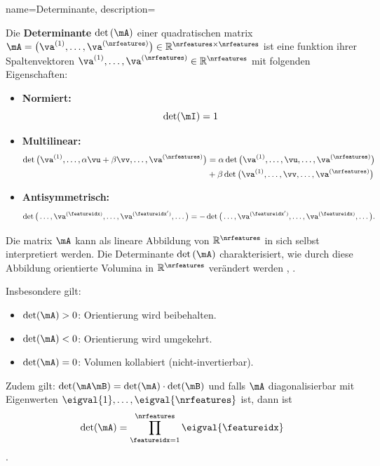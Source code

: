 {name={Determinante},
 description={Die \textbf{Determinante} $\det\,(\mA)$ einer quadratischen \gls{matrix} 
	$\mA = \big( \va^{(1)},\ldots, \va^{(\nrfeatures)} \big) \in \mathbb{R}^{\nrfeatures \times \nrfeatures}$ 
	ist eine \gls{funktion} ihrer Spaltenvektoren $\va^{(1)},\ldots,\va^{(\nrfeatures)} \in \mathbb{R}^{\nrfeatures}$ 
	\cite{DirschmidHansJorg1996TuF} mit folgenden Eigenschaften:
	\begin{itemize}
		\item \textbf{Normiert:} $$\det (\mI) = 1$$
		\item \textbf{Multilinear:}
		\begin{align} \nonumber
		\det \big(\va^{(1)},\ldots,\alpha\vu+ \beta \vv,\ldots,\va^{(\nrfeatures)} \big)
		&= \alpha\det \big(\va^{(1)},\ldots,\vu,\ldots,\va^{(\nrfeatures)} \big) \\
		&+ \beta\det \big(\va^{(1)},\ldots,\vv,\ldots,\va^{(\nrfeatures)} \big) \nonumber
		\end{align}
		\item \textbf{Antisymmetrisch:}
		$$\det \big(\ldots,\va^{(\featureidx)}, \ldots, \va^{(\featureidx')},\ldots \big) 
		= - \det \big(\ldots,\va^{(\featureidx')}, \ldots, \va^{(\featureidx)},\ldots \big).$$
	\end{itemize}
	
	Die \gls{matrix} $\mA$ kann als lineare Abbildung von $\mathbb{R}^{\nrfeatures}$ in sich selbst interpretiert werden. 
	Die Determinante $\det\,(\mA)$ charakterisiert, wie durch diese Abbildung orientierte Volumina in 
	$\mathbb{R}^{\nrfeatures}$ verändert werden \cite{GolubVanLoanBook}, \cite{Strang2007}. 
	
	Insbesondere gilt:
	\begin{itemize}
		\item $\det(\mA) > 0$: Orientierung wird beibehalten.
		\item $\det(\mA) < 0$: Orientierung wird umgekehrt.
		\item $\det(\mA) = 0$: Volumen kollabiert (nicht-invertierbar).
	\end{itemize}

	Zudem gilt: $\det(\mA \mB) = \det(\mA) \cdot \det(\mB)$ und falls $\mA$ diagonalisierbar mit Eigenwerten 
	$\eigval{1}, \ldots, \eigval{\nrfeatures}$ ist, dann ist
	$$\det(\mA) = \prod_{\featureidx=1}^{\nrfeatures} \eigval{\featureidx}$$
	\cite{HornMatAnalysis}.

}}
